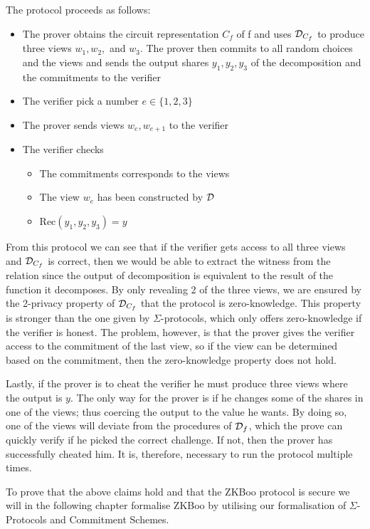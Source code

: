 The protocol proceeds as follows:
\begin{itemize}
  \item The prover obtains the circuit representation $C_{f}$ of f and uses
    $\mathcal{D}_{C_{f}}$ to produce three views $w_{1}, w_{2},$ and $w_{3}$.
    The prover then commits to all random choices and the views and sends the
    output shares $y_{1}, y_{2}, y_{3}$ of the decomposition and the commitments to the verifier
  \item The verifier pick a number $e \in \{1,2,3\}$
  \item The prover sends views $w_{e}, w_{e+1}$ to the verifier
  \item The verifier checks
    \begin{itemize}
      \item The commitments corresponds to the views
      \item The view $w_{e}$ has been constructed by $\mathcal{D}$
      \item Rec$(y_{1}, y_{2}, y_{3}) = y$
    \end{itemize}
\end{itemize}

From this protocol we can see that if the verifier gets access to all three views and
$\mathcal{D}_{C_{f}}$ is correct, then we would be able to extract the witness from
the relation since the output of decomposition is equivalent to the result of
the function it decomposes.
By only revealing 2 of the three views, we are ensured by the 2-privacy property
of $\mathcal{D}_{C_{f}}$ that the protocol is zero-knowledge. This
property is stronger than the one given by $\Sigma$-protocols, which only offers
zero-knowledge if the verifier is honest. The problem, however, is that the
prover gives the verifier access to the commitment of the last view, so if the
view can be determined based on the commitment, then the zero-knowledge property
does not hold.

Lastly, if the prover is to cheat the verifier he must produce three views where
the output is $y$.
The only way for the prover is if he changes some of
the shares in one of the views; thus coercing the output to the value he wants.
By doing so, one of the
views will deviate from the procedures of $\mathcal{D}_{f}$, which the prove can quickly
verify if he picked the correct challenge. If not, then the prover has
successfully cheated him. It is, therefore, necessary to run the protocol
multiple times.

To prove that the above claims hold and that the ZKBoo protocol is secure we will
in the following chapter formalise ZKBoo by utilising our formalisation of
$\Sigma$-Protocols and Commitment Schemes.

